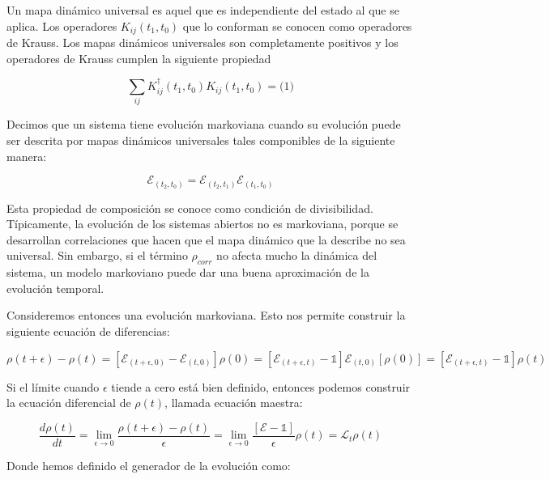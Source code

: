 Un mapa dinámico universal es aquel que es independiente del estado al que se aplica. Los operadores $K_{ij}(t_1, t_0)$ que lo conforman se conocen como operadores de Krauss. Los mapas dinámicos universales son completamente positivos y los operadores de Krauss cumplen la siguiente propiedad

\begin{equation}
    \sum_{ij} K_{ij}^\dagger(t_1, t_0) K_{ij}(t_1, t_0) = \mathds(1)
\end{equation}

Decimos que un sistema tiene evolución markoviana cuando su evolución puede ser descrita por mapas dinámicos universales tales componibles de la siguiente manera:

\begin{equation}
    \mathcal{E}_{(t_2, t_0)} = \mathcal{E}_{(t_2, t_1)} \mathcal{E}_{(t_1, t_0)}
\end{equation}

Esta propiedad de composición se conoce como condición de divisibilidad. Típicamente, la evolución de los sistemas abiertos no es markoviana, porque se desarrollan correlaciones que hacen que el mapa dinámico que la describe no sea universal. Sin embargo, si el término $\rho_{corr}$ no afecta mucho la dinámica del sistema, un modelo markoviano puede dar una buena aproximación de la evolución temporal.

Consideremos entonces una evolución markoviana. Esto nos permite construir la siguiente ecuación de diferencias:

\begin{equation}
    \rho(t + \epsilon) - \rho(t) = [\mathcal{E}_{(t+\epsilon,0)} - \mathcal{E}_{(t,0)}] \rho(0) = [\mathcal{E}_{(t+\epsilon,t)} - \mathds{1}] \mathcal{E}_{(t,0)}[\rho(0)] = [\mathcal{E}_{(t+\epsilon,t)} - \mathds{1}] \rho(t)
\end{equation}

Si el límite cuando $\epsilon$ tiende a cero está bien definido, entonces podemos construir la ecuación diferencial de $\rho(t)$, llamada ecuación maestra:

\begin{equation}
    \frac{d\rho(t)}{dt} = \lim_{\epsilon \to 0} \frac{\rho(t+\epsilon) - \rho(t)}{\epsilon} = \lim_{\epsilon \to 0} \frac{[\mathcal{E} - \mathds{1}]}{\epsilon} \rho(t) = \mathcal{L}_t \rho(t)
\end{equation}

Donde hemos definido el generador de la evolución como:

